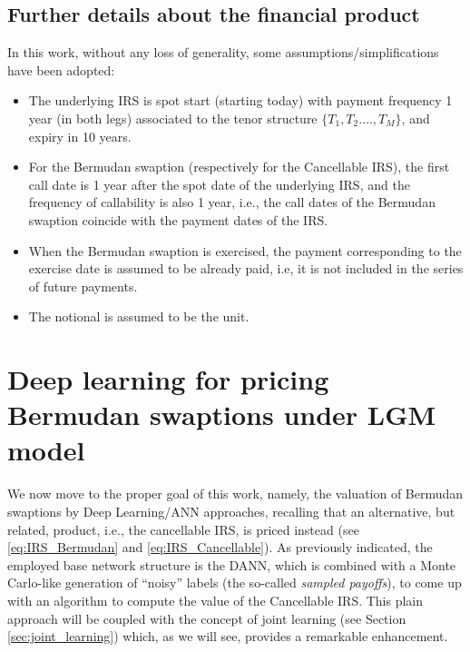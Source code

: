     \subsection{Further details about the financial product} \label{sec:details}
    
        In this work, without any loss of generality, some assumptions/simplifications have been adopted:
            \begin{itemize}
                \item The underlying IRS is spot start (starting today) with payment frequency 1 year (in both legs) associated to the tenor structure $\{T_1,T_2.\dots,T_M\}$, and expiry in 10 years.
                
                \item For the Bermudan swaption (respectively for the Cancellable IRS), the first call date is 1 year after the spot date of the underlying IRS, and the frequency of callability is also 1 year, i.e., the call dates of the Bermudan swaption coincide with the payment dates of the IRS.
                
                \item When the Bermudan swaption is exercised, the payment corresponding to the exercise date is assumed to be already paid, i.e, it is not included in the series of future payments.

                \item The notional is assumed to be the unit.
                    
            \end{itemize}


\section{Deep learning for pricing Bermudan swaptions under LGM model}\label{sec:ANN}

    We now move to the proper goal of this work, namely, the valuation of Bermudan swaptions by Deep Learning/ANN approaches, recalling that an alternative, but related, product, i.e., the cancellable IRS, is priced instead (see \eqref{eq:IRS_Bermudan} and \eqref{eq:IRS_Cancellable}). As previously indicated, the employed base network structure is the DANN, which is combined with a Monte Carlo-like generation of ``noisy'' labels (the so-called \emph{sampled payoffs}), to come up with an algorithm to compute the value of the Cancellable IRS. This plain approach will be coupled with the concept of joint learning (see Section \ref{sec:joint_learning}) which, as we will see, provides a remarkable enhancement.

